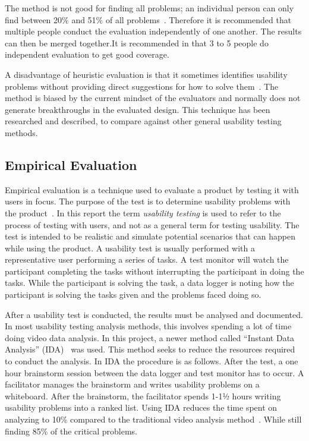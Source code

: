 The method is not good for finding all problems; an individual person
can only find between 20\% and 51\% of all
problems~\cite{Nielsen1990}. Therefore it is recommended that multiple
people conduct the evaluation independently of one another. The
results can then be merged together.It is recommended in  that 3 to 5 people do independent evaluation to get good coverage.

A disadvantage of heuristic evaluation is that it sometimes identifies usability problems without providing direct suggestions for how to solve them~\cite{Nielsen1990}. The method is biased by the current mindset of the evaluators and normally does not generate breakthroughs in the evaluated design. This technique has been researched and described, to compare against other general usability testing methods. 

\subsection{Empirical Evaluation}
\label{sub:usabilityTesting}
Empirical evaluation is a technique used to evaluate a product by testing it with users in focus. The purpose of the test is to determine usability problems with the product~\cite{RubinChisnellSpool08}. In this report the term \emph{usability testing} is used to refer to the process of testing with users, and not as a general term for testing usability. The test is intended to be realistic and simulate potential scenarios that can happen while using the product. A usability test is usually performed with a representative user performing a series of tasks. A test monitor will watch the participant completing the tasks without interrupting the participant in doing the tasks. While the participant is solving the task, a data logger is noting how the participant is solving the tasks given and the problems faced doing so.

After a usability test is conducted, the results must be analysed and documented. In most usability testing analysis methods, this involves spending a lot of time doing video data analysis. In this project, a newer method called \enquote{Instant Data Analysis} (IDA)~\cite{kjeldskov2004instant} was used. This method seeks to reduce the resources required to conduct the analysis. In IDA the procedure is as follows. After the test, a one hour brainstorm session between the data logger and test monitor has to occur. A facilitator manages the brainstorm and writes usability problems on a whiteboard. After the brainstorm, the facilitator spends 1-1½ hours writing usability problems into a ranked list. Using IDA reduces the time spent on analyzing to 10\% compared to the traditional video analysis method~\cite{kjeldskov2004instant}. While still finding 85\% of the critical problems.

